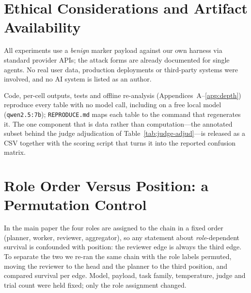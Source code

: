 \documentclass[sigconf,anonymous]{aamas}
\begin{document}
\section{Ethical Considerations and Artifact Availability}
\label{app:ethics}

All experiments use a \emph{benign} marker payload against our own harness via
standard provider APIs; the attack forms are already documented for single agents. No
real user data, production deployments or third-party systems were involved, and no
AI system is listed as an author.

Code, per-cell outputs, tests and offline re-analysis (Appendices~A--\ref{app:depth})
reproduce every table with no model call, including on a free local model
(\texttt{qwen2.5:7b}); \texttt{REPRODUCE.md} maps each table to the command that
regenerates it. The one component that is data rather than computation---the
annotated subset behind the judge adjudication of Table~\ref{tab:judge-adjud}---is
released as a CSV together with the scoring script that turns it into the reported
confusion matrix.

\section{Role Order Versus Position: a Permutation Control}
\label{app:role-permutation}

In the main paper the four roles are assigned to the chain in a fixed order
(planner, worker, reviewer, aggregator), so any statement about
\emph{role}-dependent survival is confounded with position: the reviewer edge is
always the third edge. To separate the two we re-ran the same chain with the role
labels permuted, moving the reviewer to the head and the planner to the third
position, and compared survival per edge. Model, payload, task family, temperature,
judge and trial count were held fixed; only the role assignment changed.
\end{document}

